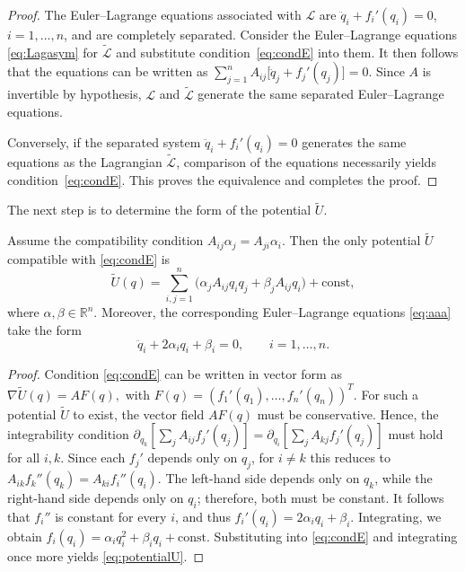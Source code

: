 \documentclass{rendiconti}
\begin{document}
\begin{proof}
The Euler--Lagrange equations associated with $\mathcal L$ are
$\ddot q_i+f_i'(q_i)=0$, $i=1,\dots,n$, and are completely separated.
Consider the Euler--Lagrange equations \eqref{eq:Lagasym} for
$\widetilde{\mathcal L}$ and substitute condition~\eqref{eq:condE} into them.
It then follows that the equations can be written as
$
\sum_{j=1}^n A_{ij}\bigl[\ddot q_j+f_j'(q_j)\bigr]=0.
$
Since $A$ is invertible by hypothesis, $\mathcal L$ and
$\widetilde{\mathcal L}$ generate the same separated Euler--Lagrange equations.

Conversely, if the separated system
$\ddot q_i+f_i'(q_i)=0$ generates the same equations as the Lagrangian
$\widetilde{\mathcal L}$, comparison of the equations necessarily yields
condition~\eqref{eq:condE}. This proves the equivalence and completes the proof.
\end{proof}
%
The next step is to determine the form of the potential $\widetilde U$.
%
\begin{proposition}
Assume the compatibility condition $A_{ij}\alpha_j = A_{ji}\alpha_i$.
Then the only potential $\widetilde U$ compatible with \eqref{eq:condE} is
\begin{equation}
\label{eq:potentialU}
\widetilde U(q)=
\sum_{i,j=1}^n \big(\alpha_j A_{ij} q_i q_j
+ \beta_j A_{ij} q_i\big) + \mathrm{const},
\end{equation}
where $\alpha, \beta \in \mathbb{R}^n$. Moreover, the corresponding
Euler--Lagrange equations \eqref{eq:aaa} take the form
\begin{equation}
\ddot q_i + 2\alpha_i q_i + \beta_i = 0,
\qquad i = 1, \dots, n.
\end{equation}
\end{proposition}
%
\begin{proof}
Condition \eqref{eq:condE} can be written in vector form as
$
\nabla \widetilde U(q) = A F(q),
$ with
$
F(q) = (f_1'(q_1), \dots, f_n'(q_n))^T.
$
For such a potential $\widetilde U$ to exist, the vector field $A F(q)$ must be conservative.
Hence, the integrability condition
$
\partial_{q_k} [ \sum_j A_{ij} f_j'(q_j) ]
=
\partial_{q_i} [ \sum_j A_{kj} f_j'(q_j)]
$
must hold for all $i,k$.
Since each $f_j'$ depends only on $q_j$, for $i \neq k$ this reduces to
$
A_{ik} f_k''(q_k) = A_{ki} f_i''(q_i).
$
The left-hand side depends only on $q_k$, while the right-hand side depends only on $q_i$; therefore, both must be constant. It follows that $f_i''$ is constant for every $i$, and thus
$
f_i'(q_i) = 2\alpha_i q_i + \beta_i.
$
Integrating, we obtain
$
f_i(q_i) = \alpha_i q_i^2 + \beta_i q_i + \mathrm{const}.
$
Substituting into \eqref{eq:condE} and integrating once more yields \eqref{eq:potentialU}.
\end{proof}
\end{document}
